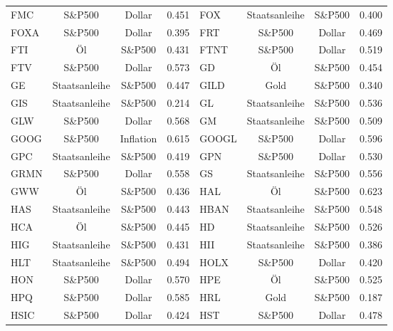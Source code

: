 \begin{longtable}{l c c c | l c c c}
    FMC    & S\&P500       & Dollar    & 0.451         & FOX    & Staatsanleihe & S\&P500   & 0.400         \\
    FOXA   & S\&P500       & Dollar    & 0.395         & FRT    & S\&P500       & Dollar    & 0.469         \\
    FTI    & Öl            & S\&P500   & 0.431         & FTNT   & S\&P500       & Dollar    & 0.519         \\
    FTV    & S\&P500       & Dollar    & 0.573         & GD     & Öl            & S\&P500   & 0.454         \\
    GE     & Staatsanleihe & S\&P500   & 0.447         & GILD   & Gold          & S\&P500   & 0.340         \\
    GIS    & Staatsanleihe & S\&P500   & 0.214         & GL     & Staatsanleihe & S\&P500   & 0.536         \\
    GLW    & S\&P500       & Dollar    & 0.568         & GM     & Staatsanleihe & S\&P500   & 0.509         \\
    GOOG   & S\&P500       & Inflation & 0.615         & GOOGL  & S\&P500       & Dollar    & 0.596         \\
    GPC    & Staatsanleihe & S\&P500   & 0.419         & GPN    & S\&P500       & Dollar    & 0.530         \\
    GRMN   & S\&P500       & Dollar    & 0.558         & GS     & Staatsanleihe & S\&P500   & 0.556         \\
    GWW    & Öl            & S\&P500   & 0.436         & HAL    & Öl            & S\&P500   & 0.623         \\
    HAS    & Staatsanleihe & S\&P500   & 0.443         & HBAN   & Staatsanleihe & S\&P500   & 0.548         \\
    HCA    & Öl            & S\&P500   & 0.445         & HD     & Staatsanleihe & S\&P500   & 0.526         \\
    HIG    & Staatsanleihe & S\&P500   & 0.431         & HII    & Staatsanleihe & S\&P500   & 0.386         \\
    HLT    & Staatsanleihe & S\&P500   & 0.494         & HOLX   & S\&P500       & Dollar    & 0.420         \\
    HON    & S\&P500       & Dollar    & 0.570         & HPE    & Öl            & S\&P500   & 0.525         \\
    HPQ    & S\&P500       & Dollar    & 0.585         & HRL    & Gold          & S\&P500   & 0.187         \\
    HSIC   & S\&P500       & Dollar    & 0.424         & HST    & S\&P500       & Dollar    & 0.478         \\

\end{longtable}
